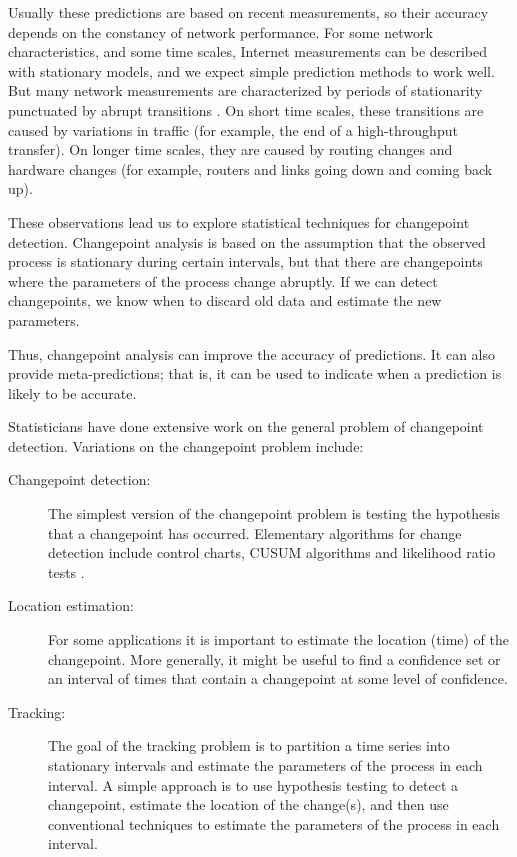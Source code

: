 \documentclass[twocolumn,11pt]{article}
\begin{document}
Usually these predictions are based on recent measurements, so their
accuracy depends on the constancy of network performance.  For some
network characteristics, and some time scales, Internet measurements
can be described with stationary models, and we expect simple
prediction methods to work well.  But many network measurements are
characterized by periods of stationarity punctuated by abrupt
transitions \cite{zhang01constancy} \cite{karagiannis04nonstationary}.
On short time scales, these transitions are caused by variations in
traffic (for example, the end of a high-throughput transfer).  On
longer time scales, they are caused by routing changes and
hardware changes (for example, routers and links going down and coming
back up).

These observations lead us to explore statistical techniques for
changepoint detection.  Changepoint analysis is based on the
assumption that the observed process is stationary during certain
intervals, but that there are changepoints where the parameters of the
process change abruptly.  If we can detect changepoints, we know
when to discard old data and estimate the new parameters.

Thus, changepoint analysis can improve the accuracy of predictions.
It can also provide meta-predictions; that is, it can be used to
indicate when a prediction is likely to be accurate.

Statisticians have done extensive work on the general problem of
changepoint detection.  Variations on the changepoint problem
\cite{bhattacharya94some} include:

\begin{description}

\item[Changepoint detection:] The simplest version of the changepoint
problem is testing the hypothesis that a changepoint has
occurred.  Elementary algorithms for change detection include control
charts, CUSUM algorithms and likelihood ratio tests
\cite{basseville93detection}.

\item[Location estimation:] For some applications it is important
to estimate the location (time) of the changepoint.  More generally, it
might be useful to find a confidence set or an interval of times
that contain a changepoint at some level of confidence.

\item[Tracking:] The goal of the tracking problem is to partition a
time series into stationary intervals and estimate the parameters of
the process in each interval.  A simple approach is to use hypothesis
testing to detect a changepoint, estimate the location of the change(s),
and then use conventional techniques to estimate the parameters of the
process in each interval.

\end{description}
\end{document}
